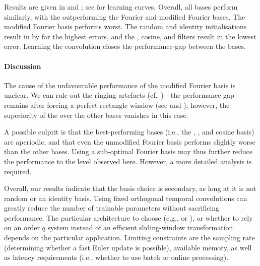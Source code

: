 Results are given in  and ; see  for learning curves.
Overall, all bases perform similarly, with the \LDN outperforming the Fourier and modified Fourier bases.
The modified Fourier basis performs worst.
The random and identity initialisations result in by far the highest errors, and the \LDN, cosine, and \DLOP filters result in the lowest error.
Learning the convolution closes the performance-gap between the bases.

\paragraph{Discussion}
The cause of the unfavourable performance of the modified Fourier basis is unclear.
We can rule out the ringing artefacts (cf.~)---the performance gap remains after forcing a perfect rectangle window (see  and ); however, the superiority of the \LDN over the other bases vanishes in this case.

A possible culprit is that the best-performing bases (i.e., the \LDN, \DLOP, and cosine basis) are aperiodic, and that even the unmodified Fourier basis performs slightly worse than the other bases.
Using a sub-optimal Fourier basis may thus further reduce the performance to the level observed here.
However, a more detailed analysis is required.

Overall, our results indicate that the basis choice is secondary, as long at it is not random or an identity basis.
Using fixed orthogonal temporal convolutions can greatly reduce the number of trainable parameters without sacrificing performance.
The particular architecture to choose (e.g., \FIR or \LRGF \LMU), or whether to rely on an order $q$ \LTI system instead of an efficient sliding-window transformation depends on the particular application.
Limiting constraints are the sampling rate (determining whether a fast Euler update is possible), available memory, as well as latency requirements (i.e., whether to use batch or online processing).
